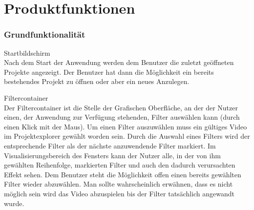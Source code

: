 \chapter {Produktfunktionen}

\subsection{Grundfunktionalität}
\setcounter{counterKriterien}{0}
 Startbildschirm \\
Nach dem Start der Anwendung werden dem Benutzer die zuletzt geöffneten Projekte angezeigt. Der Benutzer
hat dann die Möglichkeit ein bereits bestehendes Projekt zu öffnen oder aber ein neues Anzulegen.
 
 Filtercontainer \\
Der Filtercontainer ist die Stelle der Grafischen Oberfläche, an der der Nutzer einen, der Anwendung
zur Verfügung stehenden, Filter auswählen kann (durch einen Klick mit der Maus). Um einen Filter auszuwählen
muss ein gültiges Video im Projektexplorer gewählt worden sein. Durch die Auswahl eines Filters wird
der entsprechende Filter als der nächste anzuwendende Filter markiert. Im Visualisierungsbereich des
Fensters kann der Nutzer alle, in der von ihm gewählten Reihenfolge, markierten Filter und auch den
dadurch verursachten Effekt sehen. Dem Benutzer steht die Möglichkeit offen einen bereits gewählten
Filter wieder abzuwählen.
 Man sollte wahrscheinlich erwähnen, dass es nicht möglich sein wird das Video abzuspielen bis der Filter 
 tatsächlich angewandt wurde.


